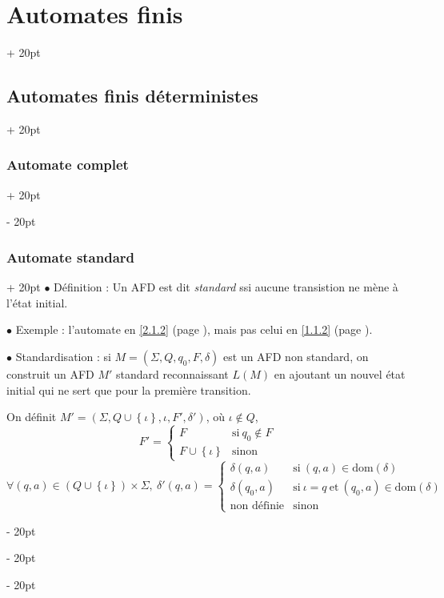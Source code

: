 \documentclass[a4paper, 12pt, twoside]{article}
\newcommand{\set}[1]{\left\{ #1 \right\}}
\newcommand{\ind}[1][20pt]{\advance\leftskip + #1}
\newcommand{\deind}[1][20pt]{\advance\leftskip - #1}
\newenvironment{indt}[2][20pt]{#2 \par \ind[#1]}{\par \deind} %
\begin{document}
\begin{indt}{\section{Automates finis}}
\begin{indt}{\subsection{Automates finis déterministes}}
\begin{indt}{\subsubsection{Automate complet}}
\begin{center}
                \end{center}
            \end{indt}

            \vspace{12pt}
            
            \begin{indt}{\subsubsection{Automate standard}}
                $\bullet$ Définition : Un AFD est dit \emph{standard} ssi aucune transistion ne mène à l'état initial.

                \vspace{12pt}
                
                $\bullet$ Exemple : l'automate en \ref{2.1.2} (page \pageref{2.1.2}), mais pas celui en \ref{1.1.2} (page \pageref{1.1.2}).

                \vspace{12pt}
                
                $\bullet$ Standardisation : si $M = (\Sigma, Q, q_0, F, \delta)$ est un AFD non standard, on construit un AFD $M'$ standard reconnaissant $L(M)$ en ajoutant un nouvel état initial qui ne sert que pour la première transition.

                On définit $M' = (\Sigma, Q \cup \set \iota, \iota, F', \delta')$, où $\iota \notin Q$,
                \[
                    F' =
                    \begin{cases}
                        F
                        & \text{si}\ q_0 \notin F
                        \\
                        F \cup \set \iota
                        & \text{sinon}
                    \end{cases}
                \]
                \[
                    \forall (q, a) \in (Q \cup \set \iota) \times \Sigma,\
                    \delta'(q, a) =
                    \begin{cases}
                        \delta(q, a)
                        & \text{si}\ (q ,a) \in \mathrm{dom}(\delta)
                        \\
                        \delta(q_0, a)
                        & \text{si}\ \iota = q\ \text{et}\ (q_0, a) \in \mathrm{dom}(\delta)
                        \\
                        \text{non définie}
                        & \text{sinon}
                    \end{cases}
                \]


\end{indt}
\end{indt}
\end{indt}
\end{document}
